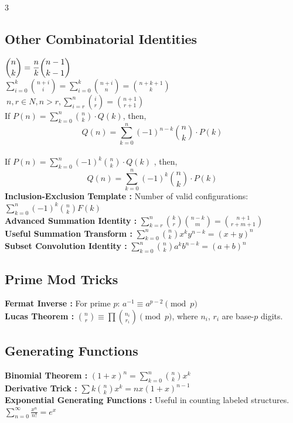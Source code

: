 \begin{multicols*}{3}
\subsection{Other Combinatorial Identities}
$\displaystyle \displaystyle {n \choose k}=\frac{n}{k}{n-1 \choose k-1}$ \\
$\displaystyle \sum \limits_{i= 0}^k{n+i \choose i}= \sum \limits_{i= 0}^k{n+i \choose n} = {n+k+1 \choose k}$ \\
$\displaystyle \ n,r \in N, n > r, \sum \limits_{i=r}^n{i \choose r}={n+1 \choose r+1}$ \\
If $\displaystyle P(n)=\sum_{k=0}^{n}{n \choose k} \cdot Q(k)$, then,
\[Q(n)=\sum_{k=0}^{n}(-1)^{n-k}{n \choose k} \cdot P(k)\] \\
If $\displaystyle P(n)=\sum_{k=0}^{n}(-1)^{k}{n \choose k} \cdot Q(k)$ , then,
\[Q(n)=\sum_{k=0}^{n}(-1)^{k}{n \choose k} \cdot P(k)\]
\textbf{Inclusion-Exclusion Template :} Number of valid configurations: $\displaystyle \sum_{k=0}^{n}(-1)^{k}{n \choose k}F(k)$ \\
\textbf{Advanced Summation Identity :} $\displaystyle \sum_{k=r}^{n}{k \choose r}{n-k \choose m}={n+1 \choose r+m+1}$ \\
\textbf{Useful Summation Transform :} $\displaystyle \sum_{k=0}^{n}{n \choose k}x^{k}y^{n-k}=(x+y)^{n}$ \\
\textbf{Subset Convolution Identity :} $\displaystyle \sum_{k=0}^{n}{n \choose k}a^{k}b^{n-k}=(a+b)^{n}$ \\

\subsection{Prime Mod Tricks}
\textbf{Fermat Inverse : } For prime $p$: $\displaystyle a^{-1}\equiv a^{p-2} \pmod p$ \\
\textbf{Lucas Theorem : } $\displaystyle {n \choose r} \equiv \prod {n_i \choose r_i} \pmod p$, where $n_i$, $r_i$ are base-$p$ digits. \\

\subsection{Generating Functions}
\textbf{Binomial Theorem : } $\displaystyle (1+x)^{n}=\sum_{k=0}^{n}{n \choose k}x^{k}$ \\
\textbf{Derivative Trick : } $\displaystyle \sum k{n \choose k}x^{k}=nx(1+x)^{n-1}$ \\
\textbf{Exponential Generating Functions : } Useful in counting labeled structures. $\displaystyle \sum_{n=0}^{\infty}\frac{x^{n}}{n!}=e^{x}$ \\


\end{multicols*}
